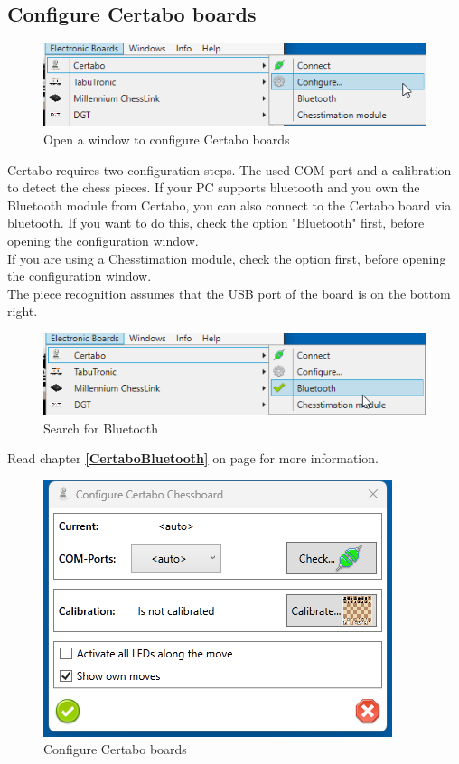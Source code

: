 \documentclass[11pt,a4paper]{article}
\begin{document}
\subsection{Configure Certabo boards} \label{ConfigureCertabo}
\begin{figure}[H]
	\centering
	\includegraphics[scale=0.9]{Certabo1.png}
	\caption{Open a window to configure Certabo boards }
	\label{fig:Certabo1}
\end{figure}

Certabo requires two configuration steps. The used COM port and a calibration to detect the chess pieces. If your PC supports bluetooth and you own the Bluetooth module from Certabo, you can also connect to the Certabo board via bluetooth. If you want to do this, check the option "Bluetooth" first, before opening the configuration window.\\
If you are using a Chesstimation module, check the option first, before opening the configuration window.\\
The piece recognition assumes that the USB port of the board is on the bottom right.

\begin{figure}[H]
	\centering
	\includegraphics[scale=0.9]{Certabo6.png}
	\caption{Search for Bluetooth }
	\label{fig:Certabo6}
\end{figure}

Read chapter \textbf{\ref{CertaboBluetooth}  } on page \pageref{CertaboBluetooth} for more information.

\begin{figure}[H]
	\centering
	\includegraphics[scale=1.0]{Certabo2.png}
	\caption{Configure Certabo boards }
	\label{fig:Certabo2}
\end{figure}
\end{document}
